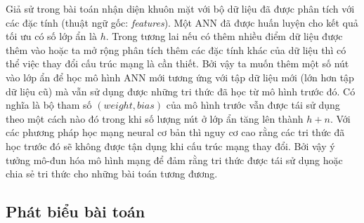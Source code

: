 Giả sử trong bài toán nhận diện khuôn mặt với bộ dữ liệu đã được phân tích với các đặc tính (thuật ngữ gốc: \emph{features}). Một ANN đã được huấn luyện cho kết quả tối ưu có số lớp ẩn là $h$. Trong tương lai nếu có thêm nhiều điểm dữ liệu được thêm vào hoặc ta mở rộng phân tích thêm các đặc tính khác của dữ liệu thì có thể việc thay đổi cấu trúc mạng là cần thiết. Bởi vậy ta muốn thêm một số nút vào lớp ẩn để học mô hình ANN mới tương ứng với tập dữ liệu mới (lớn hơn tập dữ liệu cũ) mà vẫn sử dụng được những tri thức đã học từ mô hình trước đó. Có nghĩa là bộ tham số $(weight, bias)$ của mô hình trước vẫn được tái sử dụng theo một cách nào đó trong khi số lượng nút ở lớp ẩn tăng lên thành $h + n$. Với các phương pháp học mạng neural cơ bản thì nguy cơ cao rằng các tri thức đã học trước đó sẽ không được tận dụng khi cấu trúc mạng thay đổi. Bởi vậy ý tưởng mô-đun hóa mô hình mạng để đảm rằng tri thức được tái sử dụng hoặc chia sẻ tri thức cho những bài toán tương đương. 

\subsection{Phát biểu bài toán}
